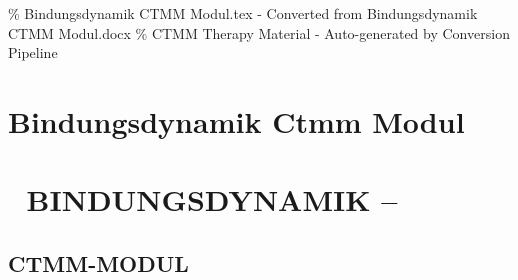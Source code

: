 \% Bindungsdynamik CTMM Modul.tex - Converted from Bindungsdynamik CTMM Modul.docx
\% CTMM Therapy Material - Auto-generated by Conversion Pipeline

\section{Bindungsdynamik Ctmm Modul}
\label{sec:bindungsdynamik-ctmm-modul}

\section{🧾 \textbf{BINDUNGSDYNAMIK --}}
\subsection{\textbf{\textcolor{ctmmBlue}{CTMM}-MODUL}}

